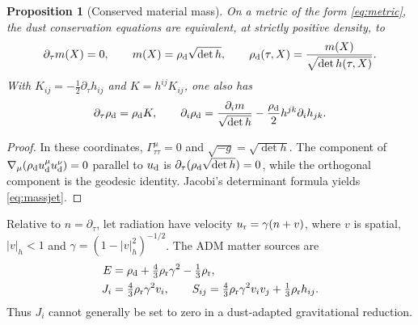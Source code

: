 \documentclass[10pt,a4paper]{article}
\newtheorem{proposition}[theorem]{Proposition}
\begin{document}
\begin{proposition}[Conserved material mass]\label{prop:material}
On a metric of the form \eqref{eq:metric}, the dust conservation equations are equivalent, at strictly positive density, to
\begin{equation}\label{eq:material}
\partial_\tau m(X)=0,\qquad m(X)=\rho_{\rm d}\sqrt{\det h},\qquad
\rho_{\rm d}(\tau,X)=\frac{m(X)}{\sqrt{\det h(\tau,X)}}.
\end{equation}
With $K_{ij}=-\frac12\partial_\tau h_{ij}$ and $K=h^{ij}K_{ij}$, one also has
\begin{equation}\label{eq:massjet}
\partial_\tau\rho_{\rm d}=\rho_{\rm d}K,
\qquad \partial_i\rho_{\rm d}=
\frac{\partial_i m}{\sqrt{\det h}}-\frac{\rho_{\rm d}}2h^{jk}\partial_i h_{jk}.
\end{equation}
\end{proposition}
\begin{proof}
In these coordinates, $\Gamma^\mu_{\tau\tau}=0$ and $\sqrt{-g}=\sqrt{\det h}$. The component of $\nabla_\mu(\rho_{\rm d}u_{\rm d}^\mu u_{\rm d}^\nu)=0$ parallel to $u_{\rm d}$ is $\partial_\tau(\rho_{\rm d}\sqrt{\det h})=0$, while the orthogonal component is the geodesic identity. Jacobi's determinant formula yields \eqref{eq:massjet}.
\end{proof}

Relative to $n=\partial_\tau$, let radiation have velocity $u_{\rm r}=\gamma(n+v)$, where $v$ is spatial, $|v|_h<1$ and $\gamma=(1-|v|_h^2)^{-1/2}$. The ADM matter sources are
\begin{align}\label{eq:admsources}
E&=\rho_{\rm d}+\tfrac43\rho_{\rm r}\gamma^2-\tfrac13\rho_{\rm r},\\
J_i&=\tfrac43\rho_{\rm r}\gamma^2v_i,\qquad
S_{ij}=\tfrac43\rho_{\rm r}\gamma^2v_i v_j+\tfrac13\rho_{\rm r}h_{ij}.
\end{align}
Thus $J_i$ cannot generally be set to zero in a dust-adapted gravitational reduction.
\end{document}
